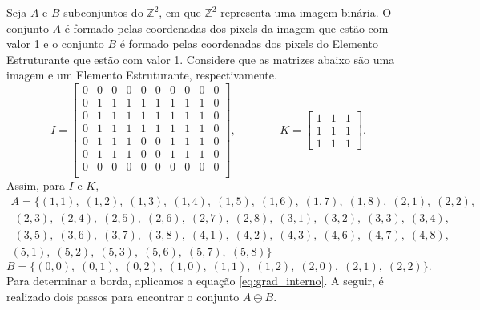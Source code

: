 \begin{exemplo}
	\label{ex:morfo_borda}
	Seja $A$ e $B$ subconjuntos do $\mathbb{Z}^2$, em que $\mathbb{Z}^2$ representa uma imagem binária. O conjunto $A$ é formado pelas coordenadas dos pixels da imagem que estão com valor 1 e o conjunto $B$ é formado pelas coordenadas dos pixels do Elemento Estruturante que estão com valor 1. Considere que as matrizes abaixo são uma imagem e um Elemento Estruturante, respectivamente.
	\begin{displaymath}
		I = \begin{bmatrix}
			0 & 0 & 0 & 0 & 0 & 0 & 0 & 0 & 0 & 0 \\
			0 & 1 & 1 & 1 & 1 & 1 & 1 & 1 & 1 & 0 \\
			0 & 1 & 1 & 1 & 1 & 1 & 1 & 1 & 1 & 0 \\
			0 & 1 & 1 & 1 & 1 & 1 & 1 & 1 & 1 & 0 \\
			0 & 1 & 1 & 1 & 0 & 0 & 1 & 1 & 1 & 0 \\
			0 & 1 & 1 & 1 & 0 & 0 & 1 & 1 & 1 & 0 \\
			0 & 0 & 0 & 0 & 0 & 0 & 0 & 0 & 0 & 0 \\ 
		\end{bmatrix}, \; \; \; \; \; \; \; \; \; \; \; \; \; \;
		K = \begin{bmatrix}
			1 & 1 & 1 \\
			1 & 1 & 1 \\
			1 & 1 & 1
		\end{bmatrix}.
	\end{displaymath}
	\noindent Assim, para $I$ e $K$,
	\begin{multline}
		A = \{(1,1), \; (1,2), \; (1,3), \; (1,4), \; (1,5), \; (1,6), \; (1,7), \; (1,8), \; (2,1), \; (2,2), \\ \; (2,3), \; (2,4), \; (2,5), \; (2,6), \; (2,7), \; (2,8), \; (3,1), \; (3,2), \; (3,3), \; (3,4), \\ \; (3,5), \; (3,6), \; (3,7), \; (3,8), \; (4,1), \; (4,2), \; (4,3), \; (4,6), \; (4,7), \; (4,8), \\
		(5,1), \; (5,2), \; (5,3), \; (5,6), \; (5,7), \; (5,8) \}
	\end{multline}
	\begin{equation}
		B = \{(0,0), \; (0,1), \; (0,2), \; (1,0), \; (1,1), \; (1,2), \; (2,0), \; (2,1), \; (2,2)\}.
	\end{equation}
	\noindent Para determinar a borda, aplicamos a equação \ref{eq:grad_interno}. A seguir, é realizado dois passos para encontrar o conjunto $A \ominus B$.
	\begin{multline}

\end{multline}
\end{exemplo}
